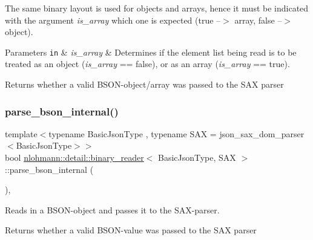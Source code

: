 The same binary layout is used for objects and arrays, hence it must be indicated with the argument {\itshape is\+\_\+array} which one is expected (true --$>$ array, false --$>$ object).


\begin{DoxyParams}[1]{Parameters}
\mbox{\tt in}  & {\em is\+\_\+array} & Determines if the element list being read is to be treated as an object ({\itshape is\+\_\+array} == false), or as an array ({\itshape is\+\_\+array} == true). \\
\hline
\end{DoxyParams}
\begin{DoxyReturn}{Returns}
whether a valid B\+S\+O\+N-\/object/array was passed to the S\+AX parser 
\end{DoxyReturn}
\mbox{\label{classnlohmann_1_1detail_1_1binary__reader_a950f6ef800421fef9499af1c4c8918f5}} 
\subsubsection{\texorpdfstring{parse\+\_\+bson\+\_\+internal()}{parse\_bson\_internal()}}
{\footnotesize\ttfamily template$<$typename Basic\+Json\+Type , typename S\+AX  = json\+\_\+sax\+\_\+dom\+\_\+parser$<$\+Basic\+Json\+Type$>$$>$ \\
bool \hyperlink{classnlohmann_1_1detail_1_1binary__reader}{nlohmann\+::detail\+::binary\+\_\+reader}$<$ Basic\+Json\+Type, S\+AX $>$\+::parse\+\_\+bson\+\_\+internal (\begin{DoxyParamCaption}{ }\end{DoxyParamCaption})\hspace{0.3cm}{\ttfamily [inline]}, {\ttfamily [private]}}



Reads in a B\+S\+O\+N-\/object and passes it to the S\+A\+X-\/parser. 

\begin{DoxyReturn}{Returns}
whether a valid B\+S\+O\+N-\/value was passed to the S\+AX parser 
\end{DoxyReturn}
\mbox{\label{classnlohmann_1_1detail_1_1binary__reader_a2fc47768d484a22fcd04e20106da1399}} 
